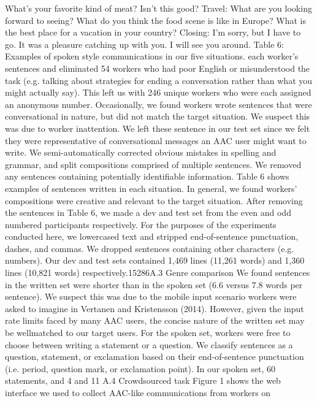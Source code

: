 What’s your favorite kind of meat?
Isn’t this good?
Travel:
What are you looking forward to seeing?
What do you think the food scene is like in Europe?
What is the best place for a vacation in your country?
Closing:
I’m sorry, but I have to go.
It was a pleasure catching up with you.
I will see you around.
Table 6: Examples of spoken style communications in
our five situations.
each worker’s sentences and eliminated 54 workers
who had poor English or misunderstood the task
(e.g. talking about strategies for ending a conversation rather than what you might actually say). This
left us with 246 unique workers who were each
assigned an anonymous number.
Occasionally, we found workers wrote sentences
that were conversational in nature, but did not
match the target situation. We suspect this was
due to worker inattention. We left these sentence in
our test set since we felt they were representative of
conversational messages an AAC user might want
to write. We semi-automatically corrected obvious mistakes in spelling and grammar, and split
compositions comprised of multiple sentences. We
removed any sentences containing potentially identifiable information.
Table 6 shows examples of sentences written
in each situation. In general, we found workers’
compositions were creative and relevant to the target situation. After removing the sentences in Table 6, we made a dev and test set from the even
and odd numbered participants respectively. For
the purposes of the experiments conducted here,
we lowercased text and stripped end-of-sentence
punctuation, dashes, and commas. We dropped sentences containing other characters (e.g. numbers).
Our dev and test sets contained 1,469 lines (11,261
words) and 1,360 lines (10,821 words) respectively.15286A.3 Genre comparison
We found sentences in the written set were shorter
than in the spoken set (6.6 versus 7.8 words per
sentence). We suspect this was due to the mobile
input scenario workers were asked to imagine in
Vertanen and Kristensson (2014). However, given
the input rate limits faced by many AAC users,
the concise nature of the written set may be wellmatched to our target users.
For the spoken set, workers were free to choose
between writing a statement or a question. We classify sentences as a question, statement, or exclamation based on their end-of-sentence punctuation
(i.e. period, question mark, or exclamation point).
In our spoken set, 60%
statements, and 4%
and 11%
A.4 Crowdsourced task
Figure 1 shows the web interface we used to collect AAC-like communications from workers on

